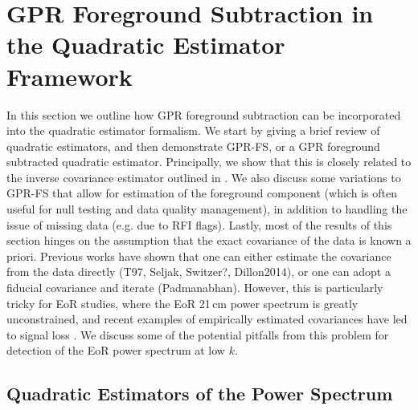 \documentclass[a4paper,fleqn,usenatbib]{mnras}
\begin{document}
\section{GPR Foreground Subtraction in the Quadratic Estimator Framework}
\label{sec:gprfs}

In this section we outline how GPR foreground subtraction can be incorporated into the quadratic estimator formalism.
We start by giving a brief review of quadratic estimators, and then demonstrate GPR-FS, or a GPR foreground subtracted quadratic estimator.
Principally, we show that this is closely related to the inverse covariance estimator outlined in \citet{Liu2011}.
We also discuss some variations to GPR-FS that allow for estimation of the foreground component (which is often useful for null testing and data quality management), in addition to handling the issue of missing data (e.g. due to RFI flags).
Lastly, most of the results of this section hinges on the assumption that the exact covariance of the data is known a priori.
Previous works have shown that one can either estimate the covariance from the data directly (T97, Seljak, Switzer?, Dillon2014), or one can adopt a fiducial covariance and iterate (Padmanabhan).
However, this is particularly tricky for EoR studies, where the EoR 21\,cm power spectrum is greatly unconstrained, and recent examples of empirically estimated covariances have led to signal loss \citep{Cheng2018}.
We discuss some of the potential pitfalls from this problem for detection of the EoR power spectrum at low $k$.

\subsection{Quadratic Estimators of the Power Spectrum}
\label{sec:qe}
\end{document}
